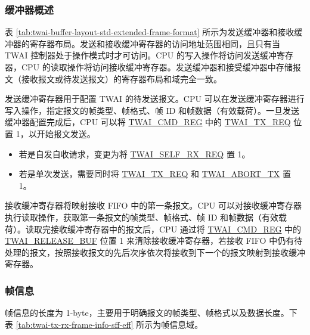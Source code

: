 \documentclass[main\_\_CN.tex]{subfiles}
\begin{document}
\subsubsection{缓冲器概述}



表 \ref{tab:twai-buffer-layout-std-extended-frame-format} 所示为发送缓冲器和接收缓冲器的寄存器布局。发送和接收缓冲寄存器的访问地址范围相同，且只有当 TWAI 控制器处于操作模式时才可访问。CPU 的写入操作将访问发送缓冲寄存器，CPU 的读取操作将访问接收缓冲寄存器。发送缓冲器和接受缓冲器中存储报文（接收报文或待发送报文）的寄存器布局和域完全一致。

发送缓冲寄存器用于配置 TWAI 的待发送报文。CPU 可以在发送缓冲寄存器进行写入操作，指定报文的帧类型、帧格式、帧 ID 和帧数据（有效载荷）。一旦发送缓冲器配置完成后，CPU 可以将 \hyperref[regdesc:TWAICMDREG]{TWAI\_CMD\_REG} 中的 \hyperref[fielddesc:TWAITXREQ]{TWAI\_TX\_REQ} 位置 1，以开始报文发送。

\begin{itemize}
    \item 若是自发自收请求，变更为将 \hyperref[fielddesc:TWAISELFRXREQ]{TWAI\_SELF\_RX\_REQ} 置 1。
    \item 若是单次发送，需要同时将 \hyperref[fielddesc:TWAITXREQ]{TWAI\_TX\_REQ} 和 \hyperref[fielddesc:TWAIABORTTX]{TWAI\_ABORT\_TX} 置 1。
\end{itemize}

接收缓冲寄存器将映射接收 FIFO 中的第一条报文。CPU 可以对接收缓冲寄存器执行读取操作，获取第一条报文的帧类型、帧格式、帧 ID 和帧数据（有效载荷）。读取完接收缓冲寄存器中的报文后，CPU 通过将 \hyperref[regdesc:TWAICMDREG]{TWAI\_CMD\_REG} 中的 \hyperref[fielddesc:TWAIRELEASEBUF]{TWAI\_RELEASE\_BUF} 位置 1 来清除接收缓冲寄存器，若接收 FIFO 中仍有待处理的报文，按照接收报文的先后次序依次将接收到下一个的报文映射到接收缓冲寄存器。

\subsubsection{帧信息}
帧信息的长度为 1-byte，主要用于明确报文的帧类型、帧格式以及数据长度。下表 \ref{tab:twai-tx-rx-frame-info-sff-eff} 所示为帧信息域。
\end{document}
